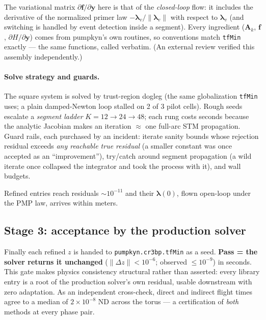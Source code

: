 \documentclass[11pt]{article}
\newcommand{\lv}{\bm{\lambda}_v}
\begin{document}
The variational matrix $\partial\bm f/\partial\bm y$ here is that of the
\emph{closed-loop} flow: it includes the derivative of the normalized
primer law $-\lv/\lVert\lv\rVert$ with respect to $\lv$ (and switching is
handled by event detection inside a segment). Every ingredient ($\bm A_k$,
$\bm f$, $\partial H/\partial\bm y$) comes from pumpkyn's own routines, so
conventions match \texttt{tfMin} exactly --- the same functions, called
verbatim. (An external review verified this
assembly independently.)

\paragraph{Solve strategy and guards.} The square system is solved by
trust-region dogleg (the same globalization \texttt{tfMin} uses; a plain
damped-Newton loop stalled on 2 of 3 pilot cells). Rough seeds escalate a
\emph{segment ladder} $K = 12 \to 24 \to 48$; each rung costs seconds
because the analytic Jacobian makes an iteration $\approx$ one full-arc
STM propagation. Guard rails, each purchased by an incident: iterate
sanity bounds whose rejection residual exceeds \emph{any reachable true
residual} (a smaller constant was once accepted as an ``improvement''),
try/catch around segment propagation (a wild iterate once collapsed the
integrator and took the process with it), and wall budgets.

Refined entries reach residuals $\sim10^{-11}$ and their $\bm\lambda(0)$,
flown open-loop under the PMP law, arrives within meters.

\subsection{Stage 3: acceptance by the production solver}

Finally each refined $z$ is handed to \texttt{pumpkyn.cr3bp.tfMin} as a
seed. \textbf{Pass = the solver returns it unchanged}
($\lVert\Delta z\rVert < 10^{-6}$; observed $\leq 10^{-9}$) in seconds.
This gate makes physics consistency structural rather than asserted: every
library entry is a root of the production solver's own residual, usable
downstream with zero adaptation. As an independent cross-check, direct and
indirect flight times agree to a median of $2\times10^{-8}$ ND across the
torus --- a certification of \emph{both} methods at every phase pair.
\end{document}
